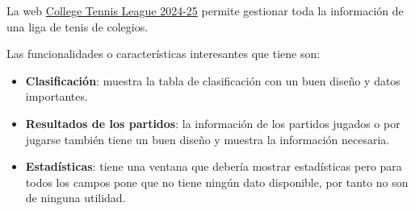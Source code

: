 La web \href{https://playwaze.com/cambridge-university-tennis-24-25/uszhp193kzm8l/league-display/leagues/jdt6ycvecilz4}{College Tennis League 2024-25} permite gestionar toda la información de una liga de tenis de colegios.

Las funcionalidades o características interesantes que tiene son:
\begin{itemize}
    \item \textbf{Clasificación}: muestra la tabla de clasificación con un buen diseño y datos importantes.
    \item \textbf{Resultados de los partidos}: la información de los partidos jugados o por jugarse también tiene un buen diseño y muestra la información necesaria.
    \item \textbf{Estadísticas}: tiene una ventana que debería mostrar estadísticas pero para todos los campos pone que no tiene ningún dato disponible, por tanto no son de ninguna utilidad.
\end{itemize}

